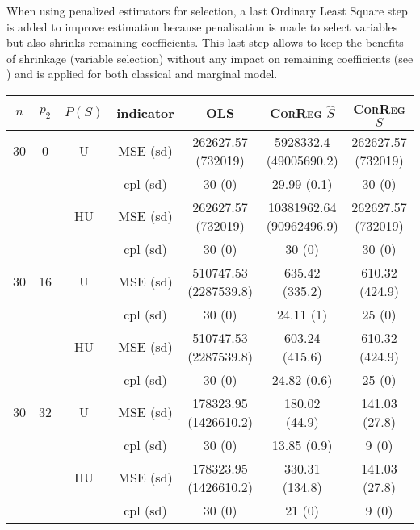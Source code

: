 \documentclass[11pt,a4paper]{article}
\begin{document}
When using penalized estimators for selection, a last Ordinary Least Square step is added to improve estimation because penalisation is made to select variables but also shrinks remaining coefficients. This last step allows to keep the benefits of shrinkage (variable selection) without any impact on remaining coefficients (see \cite{SAM10088}) and is applied for both classical and marginal model.
\begin{table}[h!]
\centering
\begin{tabular}{|c|c|c|c|c|c|c|}
\hline 
$n$ & $p_2$& $P(S)$ & indicator &OLS  &    \textsc{CorReg} $\hat S$& \textsc{CorReg} $S$\\ 
\hline %
30 & 0 & U& MSE (sd) & 262627.57 (732019) & 5928332.4 (49005690.2) & 262627.57 (732019) \\
& & & cpl (sd) & 30 (0) & 29.99 (0.1) & 30 (0) \\
 &  &HU &MSE (sd) & 262627.57 (732019) & 10381962.64 (90962496.9) & 262627.57 (732019) \\
& & & cpl (sd) & 30 (0) & 30 (0) & 30 (0) \\
\hline %
30 & 16 & U&MSE (sd) & 510747.53 (2287539.8) & 635.42 (335.2) & 610.32 (424.9) \\
& & & cpl (sd) & 30 (0) & 24.11 (1) & 25 (0) \\
 &  &HU &MSE (sd) & 510747.53 (2287539.8) & 603.24 (415.6) & 610.32 (424.9) \\
& & & cpl (sd) & 30 (0) & 24.82 (0.6) & 25 (0) \\
\hline %
30 & 32 & U & MSE (sd) & 178323.95 (1426610.2) & 180.02 (44.9) & 141.03 (27.8) \\
& & & cpl (sd) & 30 (0) & 13.85 (0.9) & 9 (0) \\
 &  & HU & MSE (sd) & 178323.95 (1426610.2) & 330.31 (134.8) & 141.03 (27.8) \\
& & & cpl (sd) & 30 (0) & 21 (0) & 9 (0) \\
\hline
\hline %

\end{tabular}
\end{table}
\end{document}
